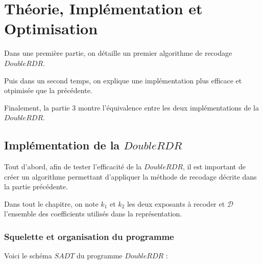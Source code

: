 \documentclass[12pt, a4paper]{memoir}
\begin{document}

  

\chapter{Théorie, Implémentation et Optimisation}

Dans une première partie, on détaille un premier algorithme de recodage $DoubleRDR$.

Puis dans un second temps, on explique une implémentation plus efficace et otpimisée que la précédente.

Finalement, la partie $3$ montre l'équivalence entre les deux implémentations de la $DoubleRDR$.

\section{Implémentation de la $DoubleRDR$}

Tout d'abord, afin de tester l'efficacité de la $DoubleRDR$, il est important de créer un algorithme permettant
d'appliquer la méthode de recodage décrite dans la partie précédente.

Dans tout le chapitre, on note $k_1$ et $k_2$ les deux exposants à recoder et $\mathcal{D}$ l'ensemble des coefficients
utilisés dans la représentation.

\subsection{Squelette et organisation du programme}

Voici le schéma $SADT$ du programme $DoubleRDR$ :

\begin{center}
\end{center}
\end{document}
